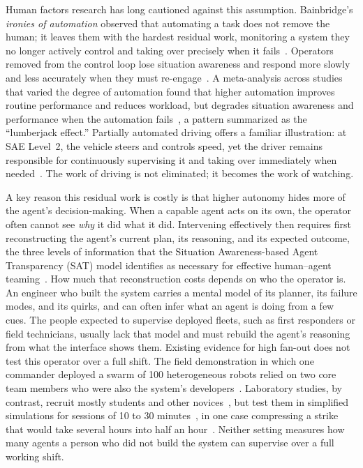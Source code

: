 \documentclass[conference]{IEEEtran}
\begin{document}
Human factors research has long cautioned against this assumption.
Bainbridge's \emph{ironies of automation} observed that automating a
task does not remove the human; it leaves them with the hardest
residual work, monitoring a system they no longer actively control
and taking over precisely when it fails~\cite{bainbridge1983ironies}.
Operators removed from the control loop lose situation awareness and
respond more slowly and less accurately when they must
re-engage~\cite{endsley1995outoftheloop}. A meta-analysis across
studies that varied the degree of automation found that higher
automation improves routine performance and reduces workload, but
degrades situation awareness and performance when the automation
fails~\cite{onnasch2014human}, a pattern summarized as the
``lumberjack effect.'' Partially automated driving offers a familiar
illustration: at SAE Level~2, the vehicle steers and controls speed,
yet the driver remains responsible for continuously supervising it
and taking over immediately when needed~\cite{sae2021j3016}. The
work of driving is not eliminated; it becomes the work of watching.

A key reason this residual work is costly is that higher autonomy
hides more of the agent's decision-making. When a capable agent acts
on its own, the operator often cannot see \emph{why} it did what it
did. Intervening effectively then requires first reconstructing the
agent's current plan, its reasoning, and its expected outcome, the
three levels of information that the Situation Awareness-based Agent
Transparency (SAT) model identifies as necessary for effective
human--agent teaming~\cite{chen2018situation}. How much that
reconstruction costs depends on who the operator is. An engineer who
built the system carries a mental model of its planner, its failure
modes, and its quirks, and can often infer what an agent is doing
from a few cues. The people expected to supervise deployed fleets,
such as first responders or field technicians, usually lack that
model and must rebuild the agent's reasoning from what the interface
shows them. Existing evidence for high fan-out does not test this
operator over a full shift. The field demonstration in which one
commander deployed a swarm of 100 heterogeneous robots relied on two
core team members who were also the system's
developers~\cite{adams2023single}. Laboratory studies, by contrast,
recruit mostly students and other
novices~\cite{hocraffer2017metaanalysis,reybecerra2026mastering,crandall2011computing},
but test them in simplified simulations for sessions of 10 to 30
minutes~\cite{clare2010assessing,cummings2008predicting}, in one case
compressing a strike that would take several hours into half an
hour~\cite{cummings2008predicting}. Neither setting measures how many
agents a person who did not build the system can supervise over a
full working shift.
\end{document}
